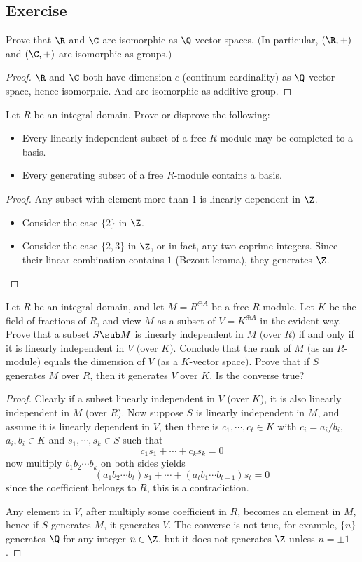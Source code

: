 \subsection{Exercise}
\begin{exercise}
Prove that $\R$ and $\C$ are isomorphic as $\Q$-vector spaces. $($In particular, $(\R,+)$ and $(\C,+)$ are isomorphic as groups.$)$ 
\end{exercise}
\begin{proof}
$\R$ and $\C$ both have dimension $c$ (continum cardinality) as $\Q$ vector space, hence isomorphic. And are isomorphic as additive group.
\end{proof}
\begin{exercise}
Let $R$ be an integral domain. Prove or disprove the following:
\begin{itemize}
\item Every linearly independent subset of a free $R$-module may be completed to a basis.
\item Every generating subset of a free $R$-module contains a basis.
\end{itemize}
\end{exercise}
\begin{proof}
Any subset with element more than $1$ is linearly dependent in $\Z$.
\begin{itemize}
\item Consider the case $\{2\}$ in $\Z$.
\item Consider the case $\{2,3\}$ in $\Z$, or in fact, any two coprime integers. Since their linear combination contains $1$ (Bezout lemma), they generates $\Z$.
\end{itemize}
\end{proof}
\begin{exercise}
Let $R$ be an integral domain, and let $M=R^{\oplus A}$ be a free $R$-module. Let $K$ be the field of fractions of $R$, and view $M$ as a subset of $V=K^{\oplus A}$ in the evident way. Prove that a subset $S\sub M$ is linearly independent in $M$ $($over $R$$)$ if and only if it is linearly independent in $V$ $($over $K$$)$. Conclude that the rank of $M$ $($as an $R$-module$)$ equals the dimension of $V$ $($as a $K$-vector space$)$. Prove that if $S$ generates $M$ over $R$, then it generates $V$ over $K$. Is the converse true?
\end{exercise}
\begin{proof}
Clearly if a subset linearly independent in $V$ (over $K$), it is also linearly independent in $M$ (over $R$). Now suppose $S$ is linearly independent in $M$, and assume it is linearly dependent in $V$, then there is $c_1,\cdots,c_t\in K $ with $c_i=a_i/b_i$, $a_i,b_i\in K$ and $s_1,\cdots,s_k\in S$ such that
\[c_1s_1+\cdots+c_ks_k=0\]
now multiply $b_1b_2\cdots b_k$ on both sides yields
\[(a_1b_2\cdots b_t)s_1+\cdots+(a_t b_1\cdots b_{t-1})s_t=0\]
since the coefficient belongs to $R$, this is a contradiction.\par
Any element in $V$, after multiply some coefficient in $R$, becomes an element in $M$, hence if $S$ generates $M$, it generates $V$. The converse is not true, for example, $\{n\}$ generates $\Q$ for any integer $n\in\Z$, but it does not generates $\Z$ unless $n=\pm 1$.
\end{proof}
